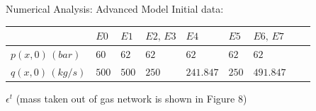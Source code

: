 \documentclass[8pt]{beamer}
\begin{document}
\begin{frame}{Numerical Analysis: Advanced Model}
\textcolor{bluepurp}{Initial data:} \newline\newline
\begin{tabular}{lllllllll}\toprule
& $E0$ &$E1$ & $E2,\, E3$ &$E4$ &$E5$&$E6, \, E7$\\
 \hline
$p(x,0) \, (bar)$ & $60$ & $62$ & $62$ & $62$ &$62$ &$62$ \\
$q(x,0) \, (kg/s)$ & $500$ & $500$ & $250$ & $241.847$ &$250$ &$491.847$\\
\bottomrule
\end{tabular}
\newline\newline\newline
$\epsilon^t $ (mass taken out of gas network is shown in \textcolor{bluepurp}{Figure 8})
\end{frame}
\end{document}
